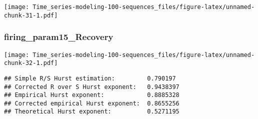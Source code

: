 \documentclass[
]{article}
\newenvironment{Shaded}{\begin{snugshade}}{\end{snugshade}}
\newcommand{\FunctionTok}[1]{\textcolor[rgb]{0.13,0.29,0.53}{\textbf{#1}}}
\newcommand{\NormalTok}[1]{#1}
\newcommand{\OtherTok}[1]{\textcolor[rgb]{0.56,0.35,0.01}{#1}}
\newcommand{\SpecialCharTok}[1]{\textcolor[rgb]{0.81,0.36,0.00}{\textbf{#1}}}
\newcommand{\StringTok}[1]{\textcolor[rgb]{0.31,0.60,0.02}{#1}}
\begin{document}
\texttt{[image: Time\_series-modeling-100-sequences\_files/figure-latex/unnamed-chunk-31-1.pdf]}

\hypertarget{firing_param15_recovery}{%
\subsubsection{firing\_param15\_Recovery}\label{firing_param15_recovery}}

\begin{Shaded}
\end{Shaded}

\texttt{[image: Time\_series-modeling-100-sequences\_files/figure-latex/unnamed-chunk-32-1.pdf]}

\begin{Shaded}
\end{Shaded}

\begin{verbatim}
## Simple R/S Hurst estimation:         0.790197 
## Corrected R over S Hurst exponent:   0.9438397 
## Empirical Hurst exponent:            0.8885328 
## Corrected empirical Hurst exponent:  0.8655256 
## Theoretical Hurst exponent:          0.5271195
\end{verbatim}

\begin{Shaded}
\end{Shaded}
\end{document}
